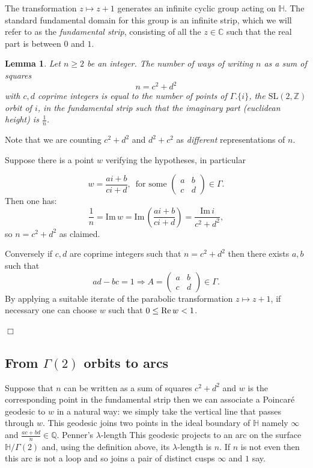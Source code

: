 \documentclass[12pt,a4paper]{amsart}
\newtheorem{lem}[thm]{Lemma}
\def\HH{\mathbb{H}}
\def\im{\mathrm{Im}\,}
\def\g2{\Gamma(2)}
\def\xx{\HH/\g2}
\def\ZZ{\mathbb{Z}}
\def\CC{\mathbb{C}}
\def\sl2{\mathrm{SL}(2, \ZZ)}
\def\oi{\Gamma.\{i\}}
\begin{document}
The transformation $z \mapsto z + 1$ generates an infinite cyclic
group acting on $\mathbb{H}$.
The standard fundamental domain for this group is an infinite strip,
which we will refer to as the \textit{fundamental strip},
consisting of all the $z\in \CC$ such that 
the real part is between $0$ and $1$.

\begin{lem} \label{counting squares}
Let $n\geq2$ be an integer.
The number of  ways of writing $n$  as a  sum of squares
$$n = c^2 + d^2$$
with $c,d$ coprime integers
is equal to the number of points
of $\oi$, 
the $\sl2$  orbit of $i$,
in the fundamental strip such that the imaginary part (euclidean height) is $\frac{1}{n}$.
\end{lem}
Note that we are counting $c^2 + d^2$ and $d^2 + c^2$ 
as \textit{different} representations of $n$.

\proof  Suppose there is a point $w$
verifying the hypotheses, in particular

$$w = \frac{ai + b}{ci + d},\, 
\text{ for some } \begin{pmatrix} a&b\\c&d
\end{pmatrix} \in \Gamma.$$
Then one has:
\begin{equation}\label{imaginary height}
\frac{1}{n}= \im w = \im  \left (\frac{ai +b}{ci+d } \right)
= \frac{\im i} {c^2 + d^2},
\end{equation}
so $n = c^2 + d^2$ as claimed.

Conversely if $c,d$ are coprime integers
such that $n=c^2 +d^2$
 then there exists $a,b$ such that
 $$ad - bc = 1 \Rightarrow  
A =  \begin{pmatrix}
 a & b \\
 c & d
 \end{pmatrix} \in \Gamma.
$$
By applying a suitable iterate of the parabolic transformation 
$z \mapsto z + 1$, if necessary 
one can choose $w$ such that $0 \leq \text{Re\,} w < 1$.

\hfill $\Box$

\subsection{From $\Gamma(2)$ orbits to arcs}

Suppose that $n$ can be written as a sum of squares $c^2 +d^2$
and $w$ is the corresponding point in the fundamental strip then we
can associate a Poincaré geodesic to $w$ in a natural way: 
we simply take the vertical line that passes through $w$.
This geodesic joins two points in the ideal boundary of $\mathbb{H}$
namely $\infty$ and $\frac{ac + bd}{n}\in \mathbb{Q}$.
Penner's $\lambda$-length
This geodesic projects to an arc on the surface $\xx$
and, using the definition above, its $\lambda$-length is $n$.
If $n$ is not even then this arc is not a loop
and so joins a pair of distinct cusps $\infty$ and $1$ say.
\end{document}
